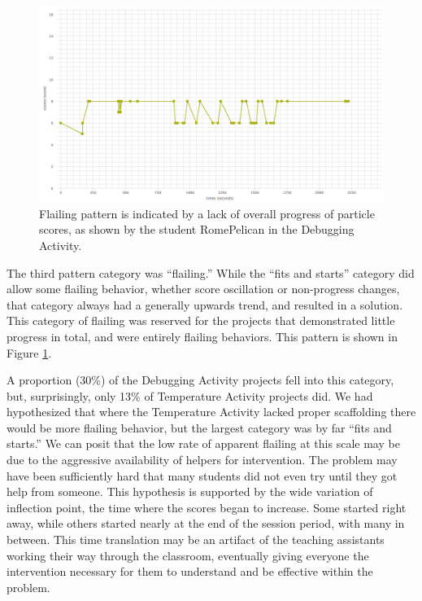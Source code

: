\begin{figure}
	\centering
	\includegraphics[width=\textwidth]{images/stories/scores-debug-RomePelican}
	\caption[Flailing Pattern, a Lack of Progress of Particle Scores]{Flailing pattern is indicated by a lack of overall progress of particle scores, as shown by the student RomePelican in the Debugging Activity.}
	\label{fig:flailing_chart}
\end{figure}
The third pattern category was ``flailing.'' While the ``fits and starts'' category did allow some flailing behavior, whether score oscillation or non-progress changes, that category always had a generally upwards trend, and resulted in a solution. This category of flailing was reserved for the projects that demonstrated little progress in total, and were entirely flailing behaviors. This pattern is shown in Figure \ref{fig:flailing_chart}. 

A proportion (30\%) of the Debugging Activity projects fell into this category, but, surprisingly, only 13\% of Temperature Activity projects did. We had hypothesized that where the Temperature Activity lacked proper scaffolding there would be more flailing behavior, but the largest category was by far ``fits and starts.'' We can posit that the low rate of apparent flailing at this scale may be due to the aggressive availability of helpers for intervention. The problem may have been sufficiently hard that many students did not even try until they got help from someone. This hypothesis is supported by the wide variation of inflection point, the time where the scores began to increase. Some started right away, while others started nearly at the end of the session period, with many in between. This time translation may be an artifact of the teaching assistants working their way through the classroom, eventually giving everyone the intervention necessary for them to understand and be effective within the problem.

